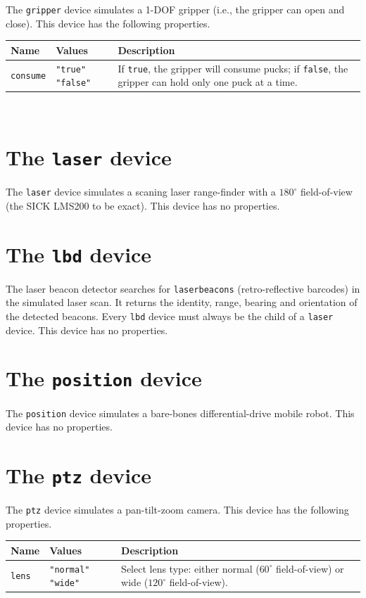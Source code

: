 \documentclass[11pt]{report}
\begin{document}
The {\tt gripper} device simulates a 1-DOF gripper (i.e., the gripper
can open and close).  This device has the following properties.
\vspace{1em}\\\noindent
\begin{tabularx}{\columnwidth}{llX}
\hline
Name & Values & Description \\
\hline

\verb'consume' & \verb'"true"' \verb'"false"' & If {\tt true}, the
gripper will consume pucks; if {\tt false}, the gripper can hold only
one puck at a time.\\

\hline
\end{tabularx}
\vspace{1em}\\


\newpage
\section{The {\tt laser} device}

The {\tt laser} device simulates a scaning laser range-finder with a
$180^\circ$ field-of-view (the SICK LMS200 to be exact).  This device
has no properties.


\newpage
\section{The {\tt lbd} device}

The laser beacon detector searches for {\tt laserbeacons}
(retro-reflective barcodes) in the simulated laser scan.  It returns
the identity, range, bearing and orientation of the detected beacons.
Every {\tt lbd} device must always be the child of a {\tt laser}
device.  This device has no properties.


\newpage
\section{The {\tt position} device}

The {\tt position} device simulates a bare-bones differential-drive
mobile robot.  This device has no properties.


\newpage
\section{The {\tt ptz} device}

The {\tt ptz} device simulates a pan-tilt-zoom camera.
This device has the following properties.
\vspace{1em}\\\noindent
\begin{tabularx}{\columnwidth}{llX}
\hline
Name & Values & Description \\
\hline

\verb'lens' & \verb'"normal"' \verb'"wide"' & Select lens type: either
normal ($60^\circ$ field-of-view) or wide ($120^\circ$
field-of-view).\\

\hline
\end{tabularx}
\vspace{1em}\\
\end{document}
